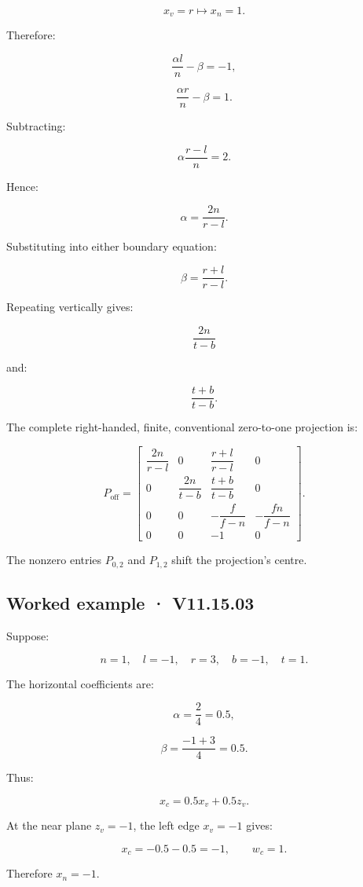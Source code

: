 \[ x_v=r\longmapsto x_n=1. \]

Therefore:

\[ \frac{\alpha l}{n}-\beta=-1, \]

\[ \frac{\alpha r}{n}-\beta=1. \]

Subtracting:

\[ \alpha\frac{r-l}{n}=2. \]

Hence:

\[ \boxed{\alpha=\frac{2n}{r-l}}. \]

Substituting into either boundary equation:

\[ \boxed{\beta=\frac{r+l}{r-l}}. \]

Repeating vertically gives:

\[ \frac{2n}{t-b} \]

and:

\[ \frac{t+b}{t-b}. \]

The complete right-handed, finite, conventional zero-to-one projection is:

\[ \boxed{ P_{\mathrm{off}}= \begin{bmatrix} \dfrac{2n}{r-l}&0&\dfrac{r+l}{r-l}&0\\ 0&\dfrac{2n}{t-b}&\dfrac{t+b}{t-b}&0\\ 0&0&-\dfrac f{f-n}&-\dfrac{fn}{f-n}\\ 0&0&-1&0 \end{bmatrix}. } \]

The nonzero entries \(P_{0,2}\) and \(P_{1,2}\) shift the projection's centre.

\subsection{Worked example · V11.15.03}\label{02-foundations-ii-ch035-worked-example-v11.15.03}

Suppose:

\[ n=1,\quad l=-1,\quad r=3,\quad b=-1,\quad t=1. \]

The horizontal coefficients are:

\[ \alpha=\frac{2}{4}=0.5, \]

\[ \beta=\frac{-1+3}{4}=0.5. \]

Thus:

\[ x_c=0.5x_v+0.5z_v. \]

At the near plane \(z_v=-1\), the left edge \(x_v=-1\) gives:

\[ x_c=-0.5-0.5=-1,\qquad w_c=1. \]

Therefore \(x_n=-1\).

